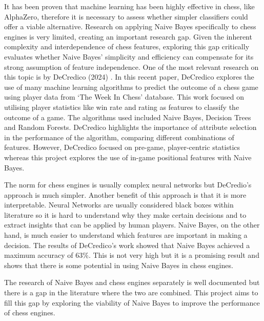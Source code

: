 It has been proven that machine learning has been highly effective in chess, like AlphaZero, therefore it is necessary to assess whether simpler classifiers could offer a viable alternative. Research on applying Naive Bayes specifically to chess engines is very limited, creating an important research gap. Given the inherent complexity and interdependence of chess features, exploring this gap critically evaluates whether Naive Bayes' simplicity and efficiency can compensate for its strong assumption of feature independence. One of the most relevant research on this topic is by DeCredico (2024) \cite{decredicoUsingMachineLearning}. In this recent paper, DeCredico explores the use of many machine learning algorithms to predict the outcome of a chess game using player data from `The Week In Chess' database. This work focused on utilising player statistics like win rate and rating as features to classify the outcome of a game. The algorithms used included Naive Bayes, Decision Trees and Random Forests. DeCredico highlights the importance of attribute selection in the performance of the algorithm, comparing different combinations of features. However, DeCredico focused on pre-game, player-centric statistics whereas this project explores the use of in-game positional features with Naive Bayes. 

The norm for chess engines is usually complex neural networks but DeCredio's approach is much simpler. Another benefit of this approach is that it is more interpretable. Neural Networks are usually considered black boxes \cite{kleinNeuralNetworksChess2022} \cite{liuInterpretableNeuralNetworks2023} within literature so it is hard to understand why they make certain decisions and to extract insights that can be applied by human players. Naive Bayes, on the other hand, is much easier to understand which features are important in making a decision. The results of DeCredico's work showed that Naive Bayes achieved a maximum accuracy of 63\%. This is not very high but it is a promising result and shows that there is some potential in using Naive Bayes in chess engines. 

The research of Naive Bayes and chess engines separately is well documented but there is a gap in the literature where the two are combined. This project aims to fill this gap by exploring the viability of Naive Bayes to improve the performance of chess engines.